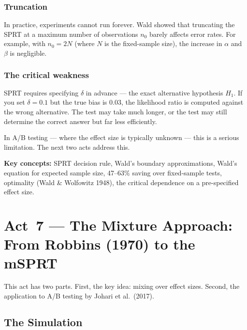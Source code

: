 \documentclass[12pt, a4paper]{article}
\begin{document}
\subsubsection*{Truncation}

In practice, experiments cannot run forever.  Wald showed that truncating the
SPRT at a maximum number of observations $n_0$ barely affects error rates.
For example, with $n_0 = 2N$ (where $N$ is the fixed-sample size), the
increase in $\alpha$ and $\beta$ is negligible.

\subsubsection*{The critical weakness}

SPRT requires specifying $\delta$ in advance --- the exact alternative
hypothesis $H_1$.  If you set $\delta = 0.1$ but
the true bias is $0.03$, the likelihood ratio is computed against the wrong
alternative.  The test may take much longer, or the test may still determine
the correct answer but far less efficiently.

In A/B testing --- where the effect size is typically unknown --- this is a
serious limitation.  The next two acts address this.

\begin{keytakeaway}
\textbf{Key concepts:} SPRT decision rule, Wald's boundary approximations,
Wald's equation for expected sample size, 47--63\% saving over fixed-sample
tests, optimality (Wald \& Wolfowitz 1948), the critical dependence on a
pre-specified effect size.
\end{keytakeaway}


\newpage
\section{Act~7 --- The Mixture Approach: From Robbins (1970) to the mSPRT}

This act has two parts.  First, the key idea: mixing over effect sizes.
Second, the application to A/B testing by Johari et al.\ (2017).

\subsection{The Simulation}
\end{document}
